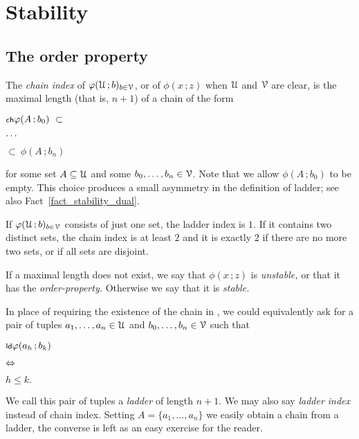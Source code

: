 \documentclass[scombinatorics.tex]{subfiles}
\begin{document}
\chapter{Stability}
\label{sauer}



\def\medrel#1{\parbox[t]{5ex}{$\displaystyle\hfil #1$}}
\def\ceq#1#2#3{\parbox[t]{20ex}{$\displaystyle #1$}\medrel{#2}{$\displaystyle #3$}}


\section{The order property}\label{ladder}

The \emph{chain index\/} of $\varphi(\EuScript U\,;b)_{b\in\EuScript V}$, or of $\phi(x\,;z)$ when $\EuScript U$ and $\EuScript V$ are clear, is the maximal length (that is, $n+1$) of a chain of the form

\ceq{\ssf{ch}\hfill\phi(A\,;b_0)\ \subset}{\dots}{\subset\ \phi(A\,;b_n)}

for some set $A\subseteq\EuScript U$ and some $b_0,\dots,b_n\in\EuScript V$.
Note that we allow $\phi(A\,;b_0)$ to be empty.
This choice produces a small asymmetry in the definition of ladder; see also Fact~\ref{fact_stability_dual}.

\begin{example}
  If $\varphi(\EuScript U\,;b)_{b\in\EuScript V}$ consists of just one set, the ladder index is $1$.
  If it contains two distinct sets, the  chain index is at least $2$ and it is exactly $2$ if there are no more two sets, or if all sets are disjoint.\QED
\end{example}

If a maximal length does not exist, we say that $\phi(x\,;z)$ is \emph{unstable,} or that it has the \emph{order-property.} 
Otherwise we say that it is \emph{stable.}

In place of requiring the existence of the chain in , we could equivalently ask for a pair of tuples $a_1,\dots,a_n\in\EuScript U$ and $b_0,\dots,b_n\in\EuScript V$ such that

\ceq{\ssf{ld}\hfill\phi(a_h\,;b_k)}
{\IFF}
{h\le k.}

We call this pair of tuples a \emph{ladder\/} of length $n+1$.
We may also say \emph{ladder index\/} instead of chain index.
Setting $A=\{a_1,\dots,a_n\}$ we easily obtain a chain from a ladder, the converse is left as an easy exercise for the reader.
\end{document}
